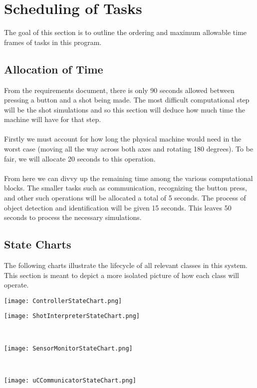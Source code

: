 \documentclass[titlepage]{article}
\begin{document}
\section{Scheduling of Tasks}
The goal of this section is to outline the ordering and maximum allowable time frames of tasks in this program.
\subsection{Allocation of Time}
From the requirements document, there is only 90 seconds allowed between pressing a button and a shot being made. The most difficult computational step will be the shot simulations and so this section will deduce how much time the machine will have for that step.\\~\\
Firstly we must account for how long the physical machine would need in the worst case (moving all the way across both axes and rotating 180 degrees). To be fair, we will allocate 20 seconds to this operation.\\~\\
From here we can divvy up the remaining time among the various computational blocks. The smaller tasks such as communication, recognizing the button press, and other such operations will be allocated a total of 5 seconds. The process of object detection and identification will be given 15 seconds. This leaves 50 seconds to process the necessary simulations.
\newpage

\subsection{State Charts}
The following charts illustrate the lifecycle of all relevant classes in this system. This section is meant to depict a more isolated picture of how each class will operate.\\[15mm]
\begin{center}
	\texttt{[image: ControllerStateChart.png]}
\label{fig:ControllerStateChart}
\end{center}
\newpage

\begin{center}
	\texttt{[image: ShotInterpreterStateChart.png]}
\label{fig:ShotInterpreterStateChart}
\end{center}
\begin{multicols}{2}
~\vfill
\begin{center}
	\texttt{[image: SensorMonitorStateChart.png]}
\label{fig:SensorMonitorStateChart}
\end{center}
~\vfill
\begin{center}
	\texttt{[image: uCCommunicatorStateChart.png]}
\label{fig:uCCommunicatorStateChart}
\end{center}
\end{multicols}
\newpage
\end{document}
